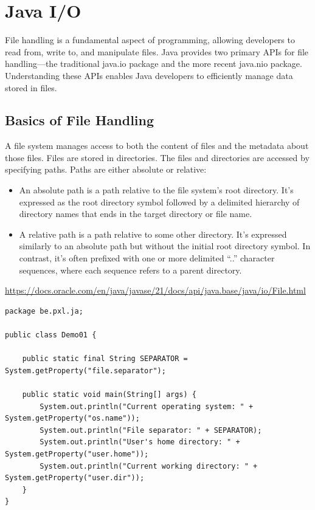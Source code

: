 \chapter{Java I/O}

 
 \begin{summary}
File handling is a fundamental aspect of programming, allowing developers to read from, write to, and manipulate files.  Java provides two primary APIs for file handling—the traditional java.io package and the more recent java.nio package. Understanding these APIs enables Java developers to efficiently manage data stored in files. 
 \end{summary}
 
 \section{Basics of File Handling}
 
A file system manages access to both the content of files and the metadata about those files.  Files are stored in directories.  The files and directories are accessed by specifying paths.  Paths are either absolute or relative:

\begin{itemize}
\item An absolute path is a path relative to the file system’s root directory. It’s expressed as the root directory symbol followed by a delimited hierarchy of directory names that ends in the target directory or file name.
\item A relative path is a path relative to some other directory. It’s expressed similarly to an absolute path but without the initial root directory symbol. In contrast, it’s often prefixed with one or more delimited “..” character sequences, where each sequence refers to a parent directory.
\end{itemize}

\begin{thm}
        \url{https://docs.oracle.com/en/java/javase/21/docs/api/java.base/java/io/File.html}
    \end{thm}



\begin{lstlisting}
package be.pxl.ja;

public class Demo01 {

	public static final String SEPARATOR = System.getProperty("file.separator");

	public static void main(String[] args) {
		System.out.println("Current operating system: " + System.getProperty("os.name"));
		System.out.println("File separator: " + SEPARATOR);
		System.out.println("User's home directory: " + System.getProperty("user.home"));
		System.out.println("Current working directory: " + System.getProperty("user.dir"));
	}
}
\end{lstlisting}


